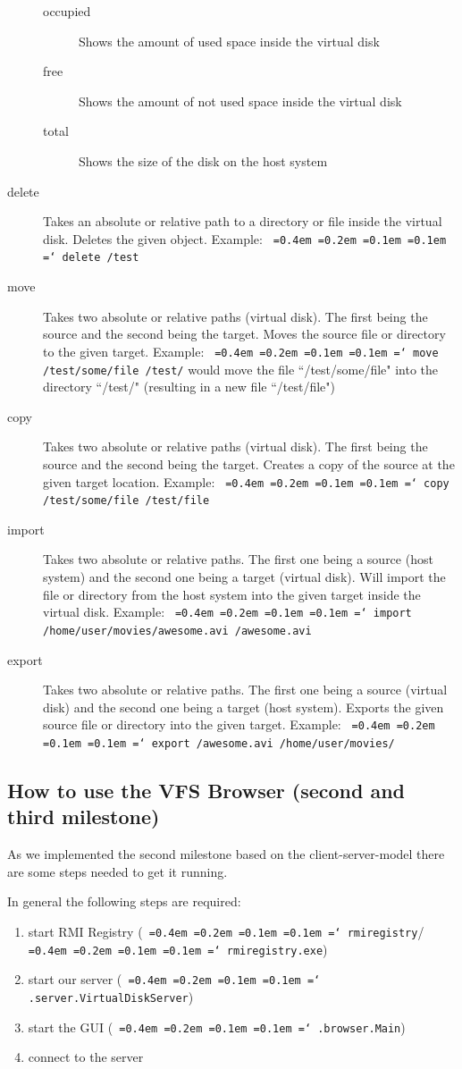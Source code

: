 \documentclass[a4paper,12pt]{article}
\newcommand*\justify{%
  \fontdimen2\font=0.4em%
  \fontdimen3\font=0.2em%
  \fontdimen4\font=0.1em%
  \fontdimen7\font=0.1em%
  \hyphenchar\font=`\-%
}
\newcommand{\mono}[1]{\texttt{\justify #1}}
\begin{document}
\begin{description}
\begin{description}
        \item [occupied] Shows the amount of used space inside the virtual disk
        \item [free] Shows the amount of not used space inside the virtual disk
        \item [total] Shows the size of the disk on the host system
    \end{description}
    \item [delete] Takes an absolute or relative path to a directory or file inside the virtual disk. Deletes the given object. Example: \mono{delete /test}
    \item [move] Takes two absolute or relative paths (virtual disk). The first being the source and the second being the target. Moves the source file or directory to the given target. Example: \mono{move /test/some/file /test/} would move the file ``/test/some/file" into the directory ``/test/" (resulting in a new file ``/test/file")
    \item [copy] Takes two absolute or relative paths (virtual disk). The first being the source and the second being the target. Creates a copy of the source at the given target location. Example: \mono{copy /test/some/file /test/file}
    \item [import] Takes two absolute or relative paths. The first one being a source (host system) and the second one being a target (virtual disk). Will import the file or directory from the host system into the given target inside the virtual disk. Example: \mono{import /home/user/movies/awesome.avi /awesome.avi}
    \item [export] Takes two absolute or relative paths. The first one being a source (virtual disk) and the second one being a target (host system). Exports the given source file or directory into the given target. Example: \mono{export /awesome.avi /home/user/movies/}
\end{description}

\subsection{How to use the VFS Browser (second and third milestone)}
As we implemented the second milestone based on the client-server-model there are some steps needed to get it running.

In general the following steps are required:
\begin{enumerate}
    \item start RMI Registry (\mono{rmiregistry}/\mono{rmiregistry.exe})
    \item start our server (\mono{.server.VirtualDiskServer})
    \item start the GUI (\mono{.browser.Main})
    \item connect to the server
\end{enumerate}
\end{document}

